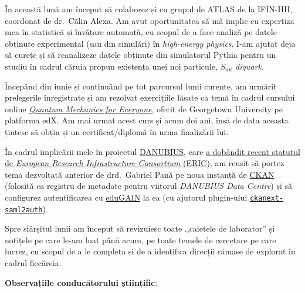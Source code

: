 În această lună am început să colaborez și cu grupul de ATLAS de la IFIN-HH, coordonat de dr.~Călin Alexa. Am avut oportunitatea să mă implic cu expertiza mea în statistică și învățare automată, cu scopul de a face analiză pe datele obținute experimental (sau din simulări) în \emph{high-energy physics}. I-am ajutat deja să curețe și să reanalizeze datele obținute din simulatorul Pythia pentru un studiu în cadrul căruia propun existența unei noi particule, \emph{\(S_{u u}\) diquark}.


Începând din iunie și continuând pe tot parcursul lunii curente, am urmărit prelegerile înregistrate și am rezolvat exercițiile lăsate ca temă în cadrul cursului online \href{https://www.edx.org/learn/quantum-physics-mechanics/georgetown-university-quantum-mechanics-for-everyone}{\emph{Quantum Mechanics for Everyone}}, oferit de Georgetown University pe platforma edX. Am mai urmat acest curs și acum doi ani, însă de data aceasta țintesc să obțin și un certificat/diplomă în urma finalizării lui.

În cadrul implicării mele în proiectul \href{https://danubius-ri.eu/}{DANUBIUS}, care \href{https://research-and-innovation.ec.europa.eu/news/all-research-and-innovation-news/danubius-ri-becomes-european-research-infrastructure-consortium-2025-06-25_en}{a dobândit recent statutul de \emph{European Research Infrastructure Consortium} (ERIC)}, am reușit să portez tema dezvoltată anterior de drd.~Gabriel Pană pe noua instanță de \href{https://ckan.org/}{CKAN} (folosită ca registru de metadate pentru viitorul \emph{DANUBIUS Data Centre}) și să configurez autentificarea cu \href{https://edugain.org/}{eduGAIN} la ea (cu ajutorul plugin-ului \href{https://github.com/keitaroinc/ckanext-saml2auth}{\texttt{ckanext-saml2auth}}).

Spre sfârșitul lunii am început să revizuiesc toate ,,caietele de laborator'' și notițele pe care le-am luat până acum, pe toate temele de cercetare pe care lucrez, cu scopul de a le completa și de a identifica direcții rămase de explorat în cadrul fiecăreia.

\textbf{Observațiile conducătorului științific}:

\vspace{3em}

